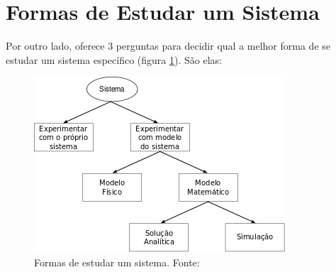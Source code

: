 \section{Formas de Estudar um Sistema}

Por outro lado, \cite{Law} oferece 3 perguntas para decidir qual a melhor forma de se estudar um sistema específico (figura \ref{fig:systemstudy}). São elas:

\begin{figure}[htb!]
\centering\includegraphics{img/systemstudy.png}
\caption{\label{fig:systemstudy}Formas de estudar um sistema. Fonte:~\cite{Law}}
\end{figure}

